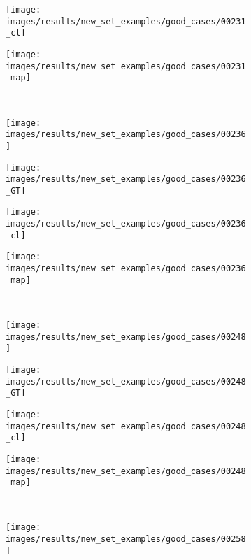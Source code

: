 \begin{figure}[t]
\begin{subfigure}[c]{0.24\textwidth}
  \centering
  \texttt{[image: images/results/new\_set\_examples/good\_cases/00231\_cl]}
 \end{subfigure}
 \begin{subfigure}[c]{0.24\textwidth}
  \centering
  \texttt{[image: images/results/new\_set\_examples/good\_cases/00231\_map]}
 \end{subfigure}
 \\
 \begin{subfigure}[c]{0.24\textwidth}
  \centering
  \texttt{[image: images/results/new\_set\_examples/good\_cases/00236]}
 \end{subfigure}
 \begin{subfigure}[c]{0.24\textwidth}
  \centering
  \texttt{[image: images/results/new\_set\_examples/good\_cases/00236\_GT]}
 \end{subfigure}
 \begin{subfigure}[c]{0.24\textwidth}
  \centering
  \texttt{[image: images/results/new\_set\_examples/good\_cases/00236\_cl]}
 \end{subfigure}
 \begin{subfigure}[c]{0.24\textwidth}
  \centering
  \texttt{[image: images/results/new\_set\_examples/good\_cases/00236\_map]}
 \end{subfigure}
 \\
 \begin{subfigure}[c]{0.24\textwidth}
  \centering
  \texttt{[image: images/results/new\_set\_examples/good\_cases/00248]}
 \end{subfigure}
 \begin{subfigure}[c]{0.24\textwidth}
  \centering
  \texttt{[image: images/results/new\_set\_examples/good\_cases/00248\_GT]}
 \end{subfigure}
 \begin{subfigure}[c]{0.24\textwidth}
  \centering
  \texttt{[image: images/results/new\_set\_examples/good\_cases/00248\_cl]}
 \end{subfigure}
 \begin{subfigure}[c]{0.24\textwidth}
  \centering
  \texttt{[image: images/results/new\_set\_examples/good\_cases/00248\_map]}
 \end{subfigure}
 \\
 \begin{subfigure}[c]{0.24\textwidth}
  \centering
  \texttt{[image: images/results/new\_set\_examples/good\_cases/00258]}

\end{subfigure}
\end{figure}
